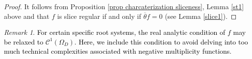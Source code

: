 \documentclass{amsart}
\theoremstyle{definition}
\theoremstyle{remark}
\newtheorem{remark}[theorem]{Remark}
\numberwithin{equation}{section}
\begin{document}
\begin{proof}
   It follows from Proposition \ref{prop charcaterization sliceness}, Lemma \ref{st1} above and that $f$ is slice regular if and only if $\overline{\theta}f=0$ (see Lemma \ref{slice1}). %
\end{proof}
\begin{remark} \textcolor{black}{For certain specific root systems, the real analytic condition of $f$ may be relaxed to $\mathcal{C}^{1}(\Omega_{D})$. Here, we include this condition  to avoid delving into  too much technical  complexities associated with  negative  multiplicity functions.}
\end{remark}
\end{document}
